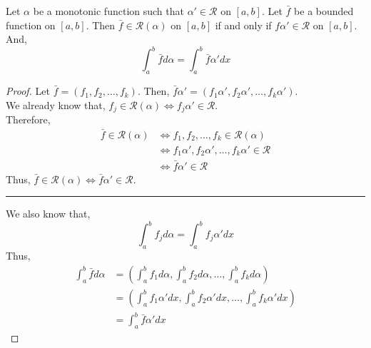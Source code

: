 \begin{commentary}
\begin{theorem}
	Let $\alpha$ be a monotonic function such that $\alpha' \in \mathscr{R}$ on $[a,b]$.
	Let $\bar{f}$ be a bounded function on $[a,b]$.
	Then $\bar{f} \in \mathscr{R}(\alpha)$ on $[a,b]$ if and only if $f\alpha' \in \mathscr{R}$ on $[a,b]$.
	And,
		\[ \int_a^b \bar{f} d\alpha = \int_a^b \bar{f}\alpha' dx \]
\end{theorem}
\begin{proof}
	Let $\bar{f} = (f_1,f_2,\dots,f_k)$.
	Then, $\bar{f}\alpha' = (f_1\alpha', f_2\alpha',\dots,f_k\alpha')$.\\
	We already know that, $f_j \in \mathscr{R}(\alpha) \iff f_j\alpha' \in \mathscr{R}$.\\
	Therefore,
	\begin{align*}
	\bar{f} \in \mathscr{R}(\alpha) 
		& \iff f_1,f_2,\dots,f_k \in \mathscr{R}(\alpha) \\
		& \iff f_1\alpha', f_2\alpha', \dots, f_k\alpha' \in \mathscr{R} \\
		& \iff \bar{f}\alpha' \in \mathscr{R}
	\end{align*}
	Thus, $\bar{f} \in \mathscr{R}(\alpha) \iff \bar{f}\alpha' \in \mathscr{R}$.\\

	\hrule \vspace{1em}
	We also know that,
		\[ \int_a^b f_j d\alpha = \int_a^b f_j\alpha' dx \]
	Thus,
	\begin{align*}
	\int_a^b \bar{f} d\alpha 
		& = \left( \int_a^b f_1 d\alpha, \int_a^b f_2 d\alpha, \dots,\int_a^b f_k d\alpha \right) \\
		& = \left( \int_a^b f_1\alpha' dx, \int_a^b f_2\alpha' dx,\dots, \int_a^b f_k\alpha' dx \right)\\
		& = \int_a^b \bar{f}\alpha' dx
	\end{align*}
\end{proof}
\end{commentary}

